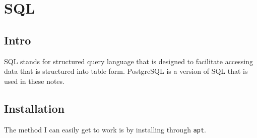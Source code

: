 \documentclass[]{book}
\newenvironment{Shaded}{\begin{snugshade}}{\end{snugshade}}
\newcommand{\StringTok}[1]{\textcolor[rgb]{0.31,0.60,0.02}{#1}}
\newcommand{\OperatorTok}[1]{\textcolor[rgb]{0.81,0.36,0.00}{\textbf{#1}}}
\newcommand{\ExtensionTok}[1]{#1}
\newcommand{\NormalTok}[1]{#1}
\begin{document}
\begin{Shaded}
\end{Shaded}

\chapter{SQL}\label{sql}

\section{Intro}\label{intro-2}

SQL stands for structured query language that is designed to facilitate
accessing data that is structured into table form. PostgreSQL is a
version of SQL that is used in these notes.

\section{Installation}\label{installation}

The method I can easily get to work is by installing through
\texttt{apt}.
\end{document}
